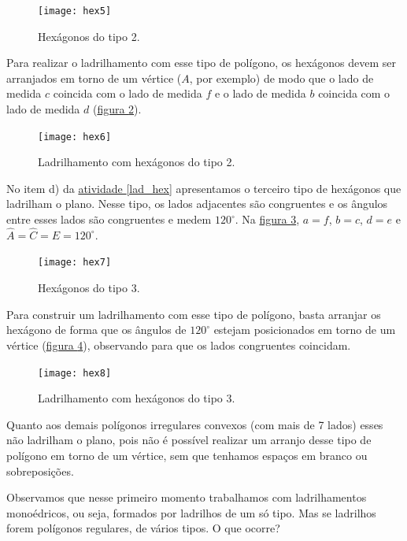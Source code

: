 \begin{figure}[H]
\centering
\texttt{[image: hex5]}
\caption{Hexágonos do tipo 2.}
\label{hex5}
\end{figure}


Para realizar o ladrilhamento com esse tipo de polígono, os hexágonos devem ser arranjados em torno de um vértice ($A$, por exemplo)  de modo que o lado de medida $c$ coincida com o lado de medida $f$ e o lado de medida $b$ coincida com o lado de medida $d$ (\hyperref[hex6]{figura \ref{hex6}}).

\begin{figure}[H]
\centering
\texttt{[image: hex6]}
\caption{Ladrilhamento com hexágonos do tipo 2.}
\label{hex6}
\end{figure}

No item d) da \hyperref[lad_hex]{atividade \ref{lad_hex}} apresentamos o terceiro tipo de hexágonos que ladrilham o plano. Nesse tipo, os lados adjacentes são congruentes e os ângulos entre esses lados são congruentes e medem $120^{\circ}$. Na \hyperref[hex7]{figura \ref{hex7}}, $a=f$, $b=c$, $d=e$ e $\hat{A}=\hat{C}=\hat{E}= 120^{\circ}$.



\begin{figure}[H]
\centering
\texttt{[image: hex7]}
\caption{Hexágonos do tipo 3.}
\label{hex7}
\end{figure}

Para construir um ladrilhamento com esse tipo de polígono, basta arranjar os hexágono de forma que os ângulos de $120^{\circ}$ estejam posicionados em torno de um vértice (\hyperref[hex8]{figura \ref{hex8}}), observando para que os lados congruentes coincidam.

\begin{figure}[H]
\centering
\texttt{[image: hex8]}
\caption{Ladrilhamento com hexágonos do tipo 3.}
\label{hex8}
\end{figure}


Quanto aos demais polígonos irregulares convexos (com mais de 7 lados) esses não ladrilham o plano, pois não é possível realizar um arranjo desse tipo de polígono em torno de um vértice, sem que tenhamos espaços em branco ou sobreposições.

Observamos que nesse primeiro momento trabalhamos com ladrilhamentos monoédricos, ou seja, formados por ladrilhos de um só tipo. Mas se  ladrilhos forem polígonos regulares, de vários tipos. O que ocorre?



